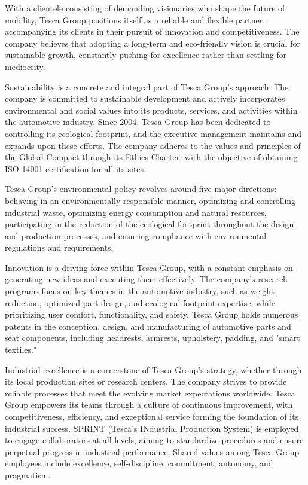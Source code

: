 With a clientele consisting of demanding visionaries who shape the future of mobility, Tesca Group positions itself as a reliable and flexible partner, accompanying its clients in their pursuit of innovation and competitiveness. The company believes that adopting a long-term and eco-friendly vision is crucial for sustainable growth, constantly pushing for excellence rather than settling for mediocrity.\cite{T23}

Sustainability is a concrete and integral part of Tesca Group's approach. The company is committed to sustainable development and actively incorporates environmental and social values into its products, services, and activities within the automotive industry. Since 2004, Tesca Group has been dedicated to controlling its ecological footprint, and the executive management maintains and expands upon these efforts. The company adheres to the values and principles of the Global Compact through its Ethics Charter, with the objective of obtaining ISO 14001 certification for all its sites.\cite{T23}

Tesca Group's environmental policy revolves around five major directions: behaving in an environmentally responsible manner, optimizing and controlling industrial waste, optimizing energy consumption and natural resources, participating in the reduction of the ecological footprint throughout the design and production processes, and ensuring compliance with environmental regulations and requirements.\cite{T23}

Innovation is a driving force within Tesca Group, with a constant emphasis on generating new ideas and executing them effectively. The company's research programs focus on key themes in the automotive industry, such as weight reduction, optimized part design, and ecological footprint expertise, while prioritizing user comfort, functionality, and safety. Tesca Group holds numerous patents in the conception, design, and manufacturing of automotive parts and seat components, including headrests, armrests, upholstery, padding, and "smart textiles."\cite{T23}

Industrial excellence is a cornerstone of Tesca Group's strategy, whether through its local production sites or research centers. The company strives to provide reliable processes that meet the evolving market expectations worldwide. Tesca Group empowers its teams through a culture of continuous improvement, with competitiveness, efficiency, and exceptional service forming the foundation of its industrial success. SPRINT (Tesca's INdustrial Production System) is employed to engage collaborators at all levels, aiming to standardize procedures and ensure perpetual progress in industrial performance. Shared values among Tesca Group employees include excellence, self-discipline, commitment, autonomy, and pragmatism.\cite{T23}

